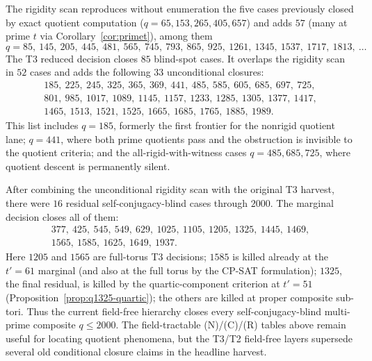 \documentclass[11pt]{article}
\theoremstyle{plain}
\theoremstyle{definition}
\theoremstyle{remark}
\begin{document}
The rigidity scan reproduces without enumeration the five cases previously
closed by exact quotient computation ($q=65,153,265,405,657$) and adds $57$
(many at prime $t$ via Corollary~\ref{cor:primet}), among them
\[
  q=85,\ 145,\ 205,\ 445,\ 481,\ 565,\ 745,\ 793,\ 865,\ 925,\ 1261,\ 1345,\
  1537,\ 1717,\ 1813,\ \dots
\]
The T3 reduced decision closes $85$ blind-spot cases. It overlaps the rigidity
scan in $52$ cases and adds the following $33$ unconditional closures:
\[
\begin{gathered}
185,\ 225,\ 245,\ 325,\ 365,\ 369,\ 441,\ 485,\ 585,\ 605,\ 685,\ 697,\ 725,\\
801,\ 985,\ 1017,\ 1089,\ 1145,\ 1157,\ 1233,\ 1285,\ 1305,\ 1377,\ 1417,\\
1465,\ 1513,\ 1521,\ 1525,\ 1665,\ 1685,\ 1765,\ 1885,\ 1989 .
\end{gathered}
\]
This list includes $q=185$, formerly the first frontier for the nonrigid
quotient lane; $q=441$, where both prime quotients pass and the obstruction is
invisible to the quotient criteria; and the all-rigid-with-witness cases
$q=485,685,725$, where quotient descent is permanently silent.

After combining the unconditional rigidity scan with the original T3 harvest,
there were $16$ residual self-conjugacy-blind cases through $2000$. The marginal
decision closes all of them:
\[
\begin{gathered}
377,\ 425,\ 545,\ 549,\ 629,\ 1025,\ 1105,\ 1205,\ 1325,\ 1445,\ 1469,\\
1565,\ 1585,\ 1625,\ 1649,\ 1937 .
\end{gathered}
\]
Here $1205$ and $1565$ are full-torus T3 decisions; $1585$ is killed already at
the $t'=61$ marginal (and also at the full torus by the CP-SAT formulation);
$1325$, the final residual, is killed by the quartic-component criterion at
$t'=51$ (Proposition~\ref{prop:q1325-quartic}); the others are killed at proper
composite sub-tori. Thus the current field-free hierarchy closes every
self-conjugacy-blind multi-prime composite $q\le2000$.
The field-tractable (N)/(C)/(R) tables above remain useful for locating quotient
phenomena, but the T3/T2 field-free layers supersede several old conditional
closure claims in the headline harvest.
\end{document}
